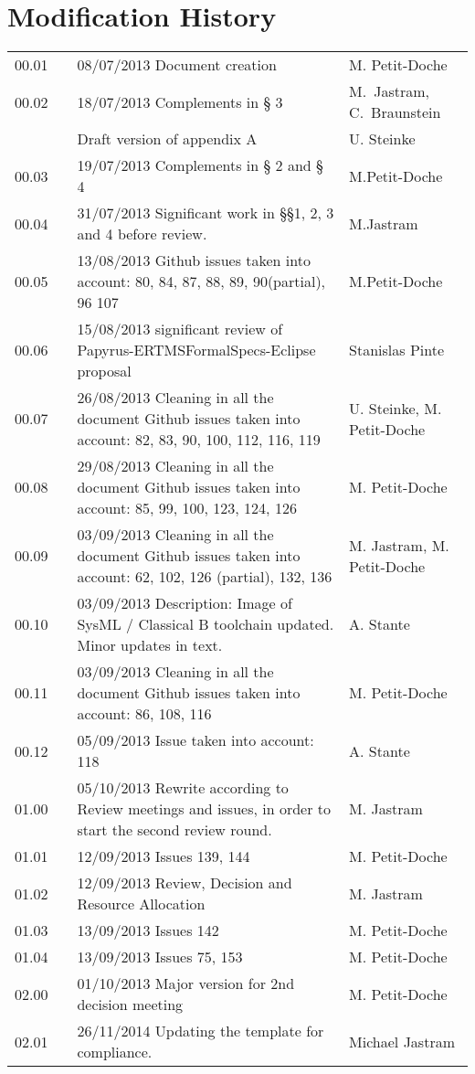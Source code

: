 \documentclass{template/openetcs_report}
\begin{document}
\section*{Modification History}
\begin{supertabular}{| m{1.2cm} | m{0.2cm} | m{7.6cm} | m{4cm} |}
00.01 & & 08/07/2013 Document creation & M. Petit-Doche  \\
00.02 & & 18/07/2013 Complements in § 3 & M.~Jastram, C.~Braunstein \\
      &  & Draft version of appendix A & U. Steinke \\
00.03 & & 19/07/2013 Complements in § 2 and § 4 & M.Petit-Doche \\
00.04 & & 31/07/2013 Significant work in §§1, 2, 3 and 4 before review. & M.Jastram \\
00.05 & & 13/08/2013 Github issues taken into account: 80, 84, 87, 88, 89, 90(partial), 96 107& M.Petit-Doche \\
00.06 & & 15/08/2013 significant review of Papyrus-ERTMSFormalSpecs-Eclipse proposal & Stanislas Pinte\\
00.07 & & 26/08/2013 Cleaning in all the document Github issues taken into account: 82, 83, 90, 100, 112, 116, 119 & U. Steinke, M. Petit-Doche \\
00.08 & & 29/08/2013 Cleaning in all the document Github issues taken into account: 85, 99, 100, 123, 124, 126 &  M. Petit-Doche \\
00.09 & & 03/09/2013 Cleaning in all the document Github issues taken into account: 62, 102, 126 (partial), 132, 136 & M. Jastram,  M. Petit-Doche \\
00.10 & & 03/09/2013 Description: Image of SysML / Classical B toolchain updated. Minor updates in text. & A. Stante \\
00.11 & & 03/09/2013 Cleaning in all the document Github issues taken into account: 86, 108, 116 &  M. Petit-Doche \\
00.12 & &05/09/2013 Issue taken into account: 118 &  A. Stante \\
01.00 & & 05/10/2013 Rewrite according to Review meetings and issues, in order to start the second review round. &  M. Jastram \\
01.01 & & 12/09/2013 Issues 139, 144 &  M. Petit-Doche  \\
01.02 & & 12/09/2013 Review, Decision and Resource Allocation &  M. Jastram \\
01.03 & & 13/09/2013 Issues 142 &  M. Petit-Doche  \\
01.04 & & 13/09/2013 Issues 75, 153 &  M. Petit-Doche \\
02.00 & & 01/10/2013 Major version for 2nd decision meeting &  M. Petit-Doche  \\
02.01 & & 26/11/2014 Updating the template for compliance. & Michael Jastram \\\hline
\end{supertabular}
\end{document}
